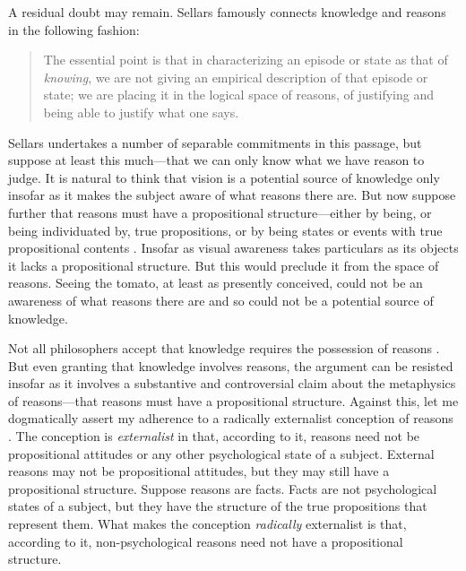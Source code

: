 \documentclass[12pt]{article}
\begin{document}
A residual doubt may remain. Sellars famously connects knowledge and reasons in the following fashion:
\begin{quote}
	The essential point is that in characterizing an episode or state as that of \emph{knowing}, we are not giving an empirical description of that episode or state; we are placing it in the logical space of reasons, of justifying and being able to justify what one says. \citep[§36]{Sellars:1956xp}
\end{quote}
Sellars undertakes a number of separable commitments in this passage, but suppose at least this much---that we can only know what we have reason to judge. It is natural to think that vision is a potential source of knowledge only insofar as it makes the subject aware of what reasons there are. But now suppose further that reasons must have a propositional structure---either by being, or being individuated by, true propositions, or by being states or events with true propositional contents \citep[see][141, 143--4]{McDowell:1996uq}. Insofar as visual awareness takes particulars as its objects it lacks a propositional structure. But this would preclude it from the space of reasons. Seeing the tomato, at least as presently conceived, could not be an awareness of what reasons there are and so could not be a potential source of knowledge.

Not all philosophers accept that knowledge requires the possession of reasons \citep[see][]{Pryor:2007fk}. But even granting that knowledge involves reasons, the argument can be resisted insofar as it involves a substantive and controversial claim about the metaphysics of reasons---that reasons must have a propositional structure. Against this, let me dogmatically assert my adherence to a radically externalist conception of reasons \citep[see][]{Scanlon:1998hb,Raz:2000tm}. The conception is \emph{externalist} in that, according to it, reasons need not be propositional attitudes or any other psychological state of a subject. External reasons may not be propositional attitudes, but they may still have a propositional structure. Suppose reasons are facts. Facts are not psychological states of a subject, but they have the structure of the true propositions that represent them. What makes the conception \emph{radically} externalist is that, according to it, non-psychological reasons need not have a propositional structure.
\end{document}
